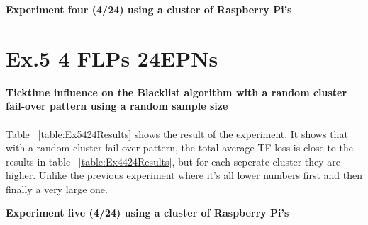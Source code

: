 \begin{table}[h!]
\caption*{\textbf{Experiment four (4/24) using a cluster of Raspberry Pi's}}
\caption{Cumulative lost TFs by ticktime/EPN ratio with a random sample size for the Blacklist algorithm and a fixed cluster 	fail-over pattern}
\label{table:Ex4424Results}
\end{table}

\section{Ex.5 4 FLPs 24EPNs}
\textbf{Ticktime influence on the Blacklist algorithm with a random cluster fail-over pattern using a random sample size}
\\~\\
Table ~\ref{table:Ex5424Results} shows the result of the experiment. It shows that with a random cluster fail-over pattern, the total average TF loss is close to the results in table ~\ref{table:Ex4424Results}, but for each seperate cluster they are higher. Unlike the previous experiment where it's all lower numbers first and then finally a very large one.

\begin{table}[h!]
\caption*{\textbf{Experiment five (4/24) using a cluster of Raspberry Pi's}}
\caption{Cumulative lost TFs by ticktime/EPN ratio with a random sample size for the Blacklist algorithm and a fixed cluster 	fail-over pattern}
\label{table:Ex5424Results}
\end{table}

